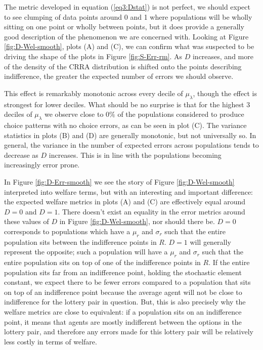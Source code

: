 \documentclass[../main.tex]{subfiles}
\begin{document}
The metric developed in equation (\ref{eq3:Dstat}) is not perfect, we should expect to see clumping of data points around 0 and 1 where populations will be wholly sitting on one point or wholly between points, but it does provide a generally good description of the phenomenon we are concerned with.
Looking at Figure \ref{fig:D-Wel-smooth}, plots (A) and (C), we can confirm what was suspected to be driving the shape of the plots in Figure \ref{fig:S-Err-rm}.
As $D$ increases, and more of the density of the CRRA distribution is shifted onto the points describing indifference, the greater the expected number of errors we should observe.

This effect is remarkably monotonic across every decile of $\mu_\lambda$, though the effect is strongest for lower deciles.
What should be no surprise is that for the highest 3 deciles of $\mu_\lambda$ we observe close to $0\%$ of the populations considered to produce choice patterns with no choice errors, as can be seen in plot (C).
The variance statistics in plots (B) and (D) are generally monotonic, but not universally so.
In general, the variance in the number of expected errors across populations tends to decrease as $D$ increases.
This is in line with the populations becoming increasingly error prone.

In Figure \ref{fig:D-Err-smooth} we see the story of Figure \ref{fig:D-Wel-smooth} interpreted into welfare terms, but with an interesting and important difference: the expected welfare metrics in plots (A) and (C) are effectively equal around $D=0$ and $D=1$.
There doesn't exist an equality in the error metrics around these values of $D$ in Figure \ref{fig:D-Wel-smooth}, nor should there be.
$D=0$ corresponds to populations which have a $\mu_r$ and $\sigma_r$ such that the entire population sits between the indifference points in $R$.
$D=1$ will generally{\footnotemark} represent the opposite; such a population will have a $\mu_r$ and $\sigma_r$ such that the entire population sits on top of one of the indifference points in $R$.
If the entire population sits far from an indifference point, holding the stochastic element constant, we expect there to be fewer errors compared to a population that sits on top of an indifference point because the average agent will not be close to indifference for the lottery pair in question.
But, this is also precisely why the welfare metrics are close to equivalent: if a population sits on an indifference point, it means that agents are mostly indifferent between the options in the lottery pair, and therefore any errors made for this lottery pair will be relatively less costly in terms of welfare.
\end{document}
